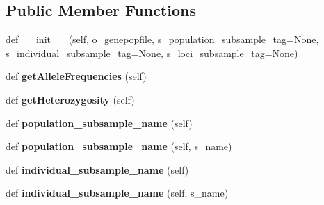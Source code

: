\subsection*{Public Member Functions}
\begin{DoxyCompactItemize}
\item 
def \hyperlink{classnegui_1_1genepopfilelociinfo_1_1GenepopFileLociInfo_a28089049eada8659a3d8c5f35d194aac}{\+\_\+\+\_\+init\+\_\+\+\_\+} (self, o\+\_\+genepopfile, s\+\_\+population\+\_\+subsample\+\_\+tag=None, s\+\_\+individual\+\_\+subsample\+\_\+tag=None, s\+\_\+loci\+\_\+subsample\+\_\+tag=None)
\item 
def {\bfseries get\+Allele\+Frequencies} (self)\hypertarget{classnegui_1_1genepopfilelociinfo_1_1GenepopFileLociInfo_a58ebbff766dcdc78a0a12bf0cd1bbec6}{}\label{classnegui_1_1genepopfilelociinfo_1_1GenepopFileLociInfo_a58ebbff766dcdc78a0a12bf0cd1bbec6}

\item 
def {\bfseries get\+Heterozygosity} (self)\hypertarget{classnegui_1_1genepopfilelociinfo_1_1GenepopFileLociInfo_acaa07360c01954cc93dc595c2a0ff240}{}\label{classnegui_1_1genepopfilelociinfo_1_1GenepopFileLociInfo_acaa07360c01954cc93dc595c2a0ff240}

\item 
def {\bfseries population\+\_\+subsample\+\_\+name} (self)\hypertarget{classnegui_1_1genepopfilelociinfo_1_1GenepopFileLociInfo_a4bb83629fa1f6b9bb2a442eaa19bb09b}{}\label{classnegui_1_1genepopfilelociinfo_1_1GenepopFileLociInfo_a4bb83629fa1f6b9bb2a442eaa19bb09b}

\item 
def {\bfseries population\+\_\+subsample\+\_\+name} (self, s\+\_\+name)\hypertarget{classnegui_1_1genepopfilelociinfo_1_1GenepopFileLociInfo_a6ba9b9e9512ac3e9f6028f447aa64e80}{}\label{classnegui_1_1genepopfilelociinfo_1_1GenepopFileLociInfo_a6ba9b9e9512ac3e9f6028f447aa64e80}

\item 
def {\bfseries individual\+\_\+subsample\+\_\+name} (self)\hypertarget{classnegui_1_1genepopfilelociinfo_1_1GenepopFileLociInfo_af5fadee46f93aace5513738ed0f2ddb0}{}\label{classnegui_1_1genepopfilelociinfo_1_1GenepopFileLociInfo_af5fadee46f93aace5513738ed0f2ddb0}

\item 
def {\bfseries individual\+\_\+subsample\+\_\+name} (self, s\+\_\+name)\hypertarget{classnegui_1_1genepopfilelociinfo_1_1GenepopFileLociInfo_a503c6ae38a3435c6bbc6e37b51202c77}{}\label{classnegui_1_1genepopfilelociinfo_1_1GenepopFileLociInfo_a503c6ae38a3435c6bbc6e37b51202c77}


\end{DoxyCompactItemize}
